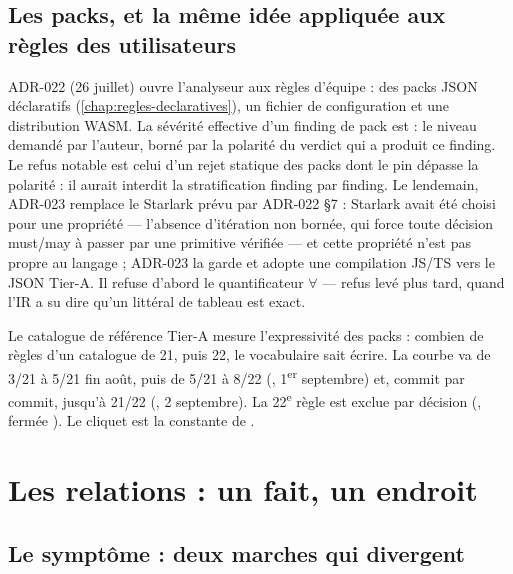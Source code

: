 \subsection{Les packs, et la même idée appliquée aux règles des utilisateurs}

ADR-022 (26 juillet) ouvre l'analyseur aux règles d'équipe : des packs JSON déclaratifs (\cref{chap:regles-declaratives}), un fichier de configuration et une distribution WASM. La sévérité effective d'un finding de pack est  : le niveau demandé par l'auteur, borné par la polarité du verdict qui a produit ce finding. Le refus notable est celui d'un rejet statique des packs dont le pin dépasse la polarité : il aurait interdit la stratification finding par finding. Le lendemain, ADR-023 remplace le Starlark prévu par ADR-022 §7 : Starlark avait été choisi pour une propriété --- l'absence d'itération non bornée, qui force toute décision must/may à passer par une primitive vérifiée --- et cette propriété n'est pas propre au langage ; ADR-023 la garde et adopte une compilation JS/TS vers le JSON Tier-A. Il refuse d'abord le quantificateur $\forall$ --- refus levé plus tard, quand l'IR a su dire qu'un littéral de tableau est exact.

\begin{remarque}
Le catalogue de référence Tier-A mesure l'expressivité des packs : combien de règles d'un catalogue de 21, puis 22, le vocabulaire sait écrire. La courbe va de 3/21 à 5/21 fin août, puis de 5/21 à 8/22 (, 1\textsuperscript{er} septembre) et, commit par commit, jusqu'à 21/22 (, 2 septembre). La 22\textsuperscript{e} règle est exclue par décision (, fermée ). Le cliquet est la constante  de .
\end{remarque}

\section{Les relations : un fait, un endroit}
\label{sec:histoire-doctrine-relations}

\subsection{Le symptôme : deux marches qui divergent}

